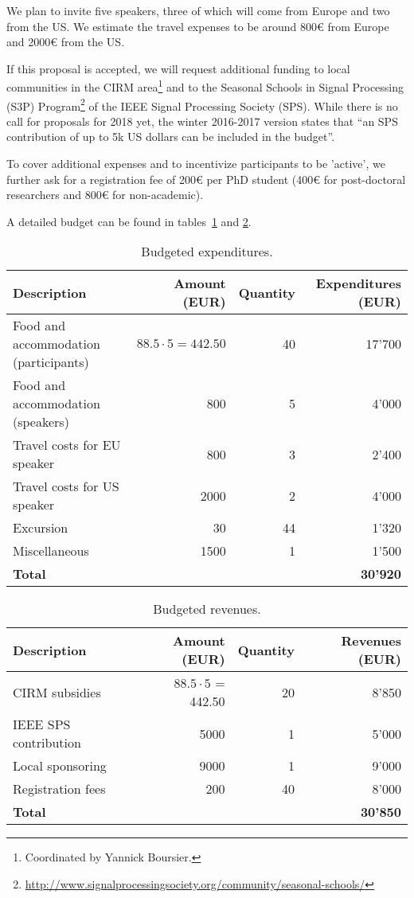 \documentclass[a4paper]{scrartcl}
\begin{document}
We plan to invite five speakers, three of which will come from Europe and two
from the US. We estimate the travel expenses to be around 800€ from Europe and
2000€ from the US.

If this proposal is accepted, we will request additional funding to local
communities in the CIRM area\footnote{Coordinated by Yannick Boursier.} and to
the Seasonal Schools in Signal Processing (S3P) Program\footnote{
\url{http://www.signalprocessingsociety.org/community/seasonal-schools/}}
of the IEEE Signal Processing Society (SPS). While there is no call for
proposals for 2018 yet, the winter 2016-2017 version states that ``an SPS
contribution of up to 5k US dollars can be included in the budget''.

To cover additional expenses and to incentivize participants to be 'active', we
further ask for a registration fee of 200€ per PhD student (400€ for
post-doctoral researchers and 800€ for non-academic).

A detailed budget can be found in tables~\ref{tab:expenditures} and
\ref{tab:revenues}.

\begin{table}[ht]
	\centering
	\begin{tabular}{|l|r|r|r|}
	\hline
	Description & Amount (EUR) & Quantity & Expenditures (EUR) \\
	\hline
	Food and accommodation (participants) & $88.5\cdot5=442.50$ & 40 & 17'700 \\
	Food and accommodation (speakers) & 800 & 5 & 4'000 \\
	Travel costs for EU speaker & 800  & 3 & 2'400 \\
	Travel costs for US speaker & 2000 & 2 & 4'000 \\
	Excursion & 30 & 44 & 1'320 \\
	Miscellaneous & 1500 & 1 & 1'500 \\
	\hline
	\multicolumn{3}{|l|}{\textbf{Total}} & \textbf{30'920} \\
	\hline
	\end{tabular}
	\caption{Budgeted expenditures.}
	\label{tab:expenditures}
\end{table}

\begin{table}[ht]
	\centering
	\begin{tabular}{|l|r|r|r|}
	\hline
	Description & Amount (EUR) & Quantity & Revenues (EUR) \\
	\hline
	CIRM subsidies & $88.5 \cdot 5$ = 442.50 & 20 & 8'850 \\
	IEEE SPS contribution & 5000 & 1 & 5'000 \\
	Local sponsoring & 9000  & 1 & 9'000 \\
	Registration fees & 200 & 40 & 8'000 \\
	\hline
	\multicolumn{3}{|l|}{\textbf{Total}} & \textbf{30'850} \\
	\hline
	\end{tabular}
	\caption{Budgeted revenues.}
	\label{tab:revenues}
\end{table}

\printbibliography
\end{document}

